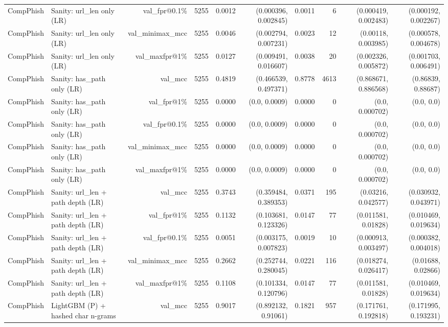 \begin{table}[t]
\begin{tabular}{llrrrrrrrr}
CompPhish & Sanity: url\_len only (LR) & val\_fpr@0.1\% & 5255 & 0.0012 & (0.000396, 0.002845) & 0.0011 & 6 & (0.000419, 0.002483) & (0.000192, 0.002267) \\
CompPhish & Sanity: url\_len only (LR) & val\_minimax\_mcc & 5255 & 0.0046 & (0.002794, 0.007231) & 0.0023 & 12 & (0.00118, 0.003985) & (0.000578, 0.004678) \\
CompPhish & Sanity: url\_len only (LR) & val\_maxfpr@1\% & 5255 & 0.0127 & (0.009491, 0.016607) & 0.0038 & 20 & (0.002326, 0.005872) & (0.001703, 0.006491) \\
CompPhish & Sanity: has\_path only (LR) & val\_mcc & 5255 & 0.4819 & (0.466539, 0.497371) & 0.8778 & 4613 & (0.868671, 0.886568) & (0.86839, 0.88687) \\
CompPhish & Sanity: has\_path only (LR) & val\_fpr@1\% & 5255 & 0.0000 & (0.0, 0.0009) & 0.0000 & 0 & (0.0, 0.000702) & (0.0, 0.0) \\
CompPhish & Sanity: has\_path only (LR) & val\_fpr@0.1\% & 5255 & 0.0000 & (0.0, 0.0009) & 0.0000 & 0 & (0.0, 0.000702) & (0.0, 0.0) \\
CompPhish & Sanity: has\_path only (LR) & val\_minimax\_mcc & 5255 & 0.0000 & (0.0, 0.0009) & 0.0000 & 0 & (0.0, 0.000702) & (0.0, 0.0) \\
CompPhish & Sanity: has\_path only (LR) & val\_maxfpr@1\% & 5255 & 0.0000 & (0.0, 0.0009) & 0.0000 & 0 & (0.0, 0.000702) & (0.0, 0.0) \\
CompPhish & Sanity: url\_len + path depth (LR) & val\_mcc & 5255 & 0.3743 & (0.359484, 0.389353) & 0.0371 & 195 & (0.03216, 0.042577) & (0.030932, 0.043971) \\
CompPhish & Sanity: url\_len + path depth (LR) & val\_fpr@1\% & 5255 & 0.1132 & (0.103681, 0.123326) & 0.0147 & 77 & (0.011581, 0.01828) & (0.010469, 0.019634) \\
CompPhish & Sanity: url\_len + path depth (LR) & val\_fpr@0.1\% & 5255 & 0.0051 & (0.003175, 0.007823) & 0.0019 & 10 & (0.000913, 0.003497) & (0.000382, 0.004018) \\
CompPhish & Sanity: url\_len + path depth (LR) & val\_minimax\_mcc & 5255 & 0.2662 & (0.252744, 0.280045) & 0.0221 & 116 & (0.018274, 0.026417) & (0.01688, 0.02866) \\
CompPhish & Sanity: url\_len + path depth (LR) & val\_maxfpr@1\% & 5255 & 0.1108 & (0.101334, 0.120796) & 0.0147 & 77 & (0.011581, 0.01828) & (0.010469, 0.019634) \\
CompPhish & LightGBM (P) + hashed char n-grams & val\_mcc & 5255 & 0.9017 & (0.892132, 0.91061) & 0.1821 & 957 & (0.171761, 0.192818) & (0.171995, 0.193231) \\

\end{tabular}
\end{table}
